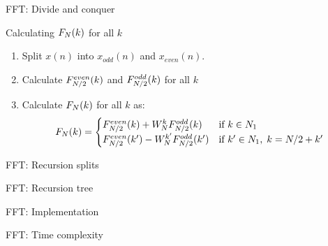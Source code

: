 \begin{myframe}{FFT: Divide and conquer}
\centering
\begin{block}{Calculating $F_N(k)$ for all $k$}
\begin{enumerate}
\item Split $x(n)$ into $x_{odd}(n)$ and $x_{even}(n)$.
\item Calculate $F_{N/2}^{even}(k)$ and $F_{N/2}^{odd}(k)$ for all $k$
\item Calculate $F_N(k)$ for all $k$ as:
\begin{equation}
F_N (k) = \begin{cases}
F_{N/2}^{even} (k) + W_N^{k} F_{N/2}^{odd} (k) & \mbox{if } k \in N_1 \\
F_{N/2}^{even} (k') - W_N^{k'} F_{N/2}^{odd} (k') & \mbox{if } k' \in N_1, \; k=N/2+k'
\end{cases}
\end{equation}

\end{enumerate}
\end{block}
\end{myframe}

\begin{myframe}{FFT: Recursion splits}
\centering
\scalebox{0.75}{
    
} 
\end{myframe}

\begin{myframe}{FFT: Recursion tree}
\centering
\scalebox{0.85}{
    
} 
\end{myframe}

\begin{myframe}{FFT: Implementation}
\centering

\end{myframe}

\begin{myframe}{FFT: Time complexity}
\centering

\end{myframe}

